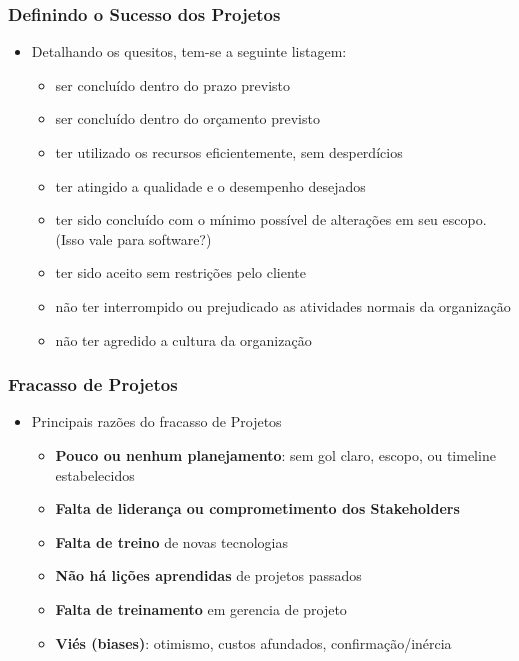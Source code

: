      \begin{frame}
   \frametitle{Definindo o Sucesso dos Projetos}
   \begin{itemize}
    \item Detalhando os quesitos, tem-se a seguinte listagem:
    \begin{itemize}
     \item ser concluído dentro do prazo previsto
     \item ser concluído dentro do orçamento previsto
     \item ter utilizado os recursos eficientemente, sem desperdícios
     \item ter atingido a qualidade e o desempenho desejados
     \item ter sido concluído com o mínimo possível de alterações em seu escopo. (Isso vale para software?)
     \item ter sido aceito sem restrições pelo cliente
     \item não ter interrompido ou prejudicado as atividades normais da organização
     \item não ter agredido a cultura da organização
    \end{itemize}
   \end{itemize}
  \end{frame}
  
  \begin{frame}
 \frametitle{Fracasso de Projetos}
 \begin{itemize}
  \item Principais razões  do fracasso de Projetos
  \begin{itemize}
   \item \textbf{Pouco ou nenhum planejamento}: sem gol claro, escopo, ou timeline estabelecidos
   \item \textbf{Falta de liderança ou comprometimento dos Stakeholders}
   \item \textbf{Falta de treino} de novas tecnologias
   \item \textbf{Não há lições aprendidas} de projetos passados
   \item \textbf{Falta de treinamento} em gerencia de projeto
   \item \textbf{Viés (biases)}: otimismo, custos afundados, confirmação/inércia
  \end{itemize}
 \end{itemize}
\end{frame}


